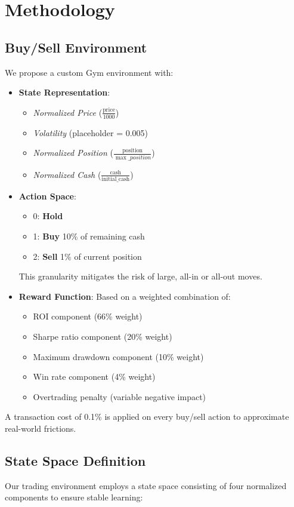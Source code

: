 \documentclass[11pt]{article}
\begin{document}
\section{Methodology}
\subsection{Buy/Sell Environment}
We propose a custom Gym environment with:
\begin{itemize}
  \item \textbf{State Representation}: 
  \begin{itemize}
    \item \textit{Normalized Price} (\(\frac{\text{price}}{1000}\))
    \item \textit{Volatility} (placeholder = 0.005)
    \item \textit{Normalized Position} (\(\frac{\text{position}}{\max\_position}\))
    \item \textit{Normalized Cash} (\(\frac{\text{cash}}{\text{initial\_cash}}\))
  \end{itemize}
  \item \textbf{Action Space}: 
  \begin{itemize}
    \item 0: \textbf{Hold}
    \item 1: \textbf{Buy} 10\% of remaining cash
    \item 2: \textbf{Sell} 1\% of current position
  \end{itemize}
  This granularity mitigates the risk of large, all-in or all-out moves.
  \item \textbf{Reward Function}: Based on a weighted combination of:
  \begin{itemize}
    \item ROI component (66\% weight)
    \item Sharpe ratio component (20\% weight)
    \item Maximum drawdown component (10\% weight)
    \item Win rate component (4\% weight)
    \item Overtrading penalty (variable negative impact)
  \end{itemize}
\end{itemize}
A transaction cost of 0.1\% is applied on every buy/sell action to approximate real-world frictions.

\subsection{State Space Definition}
Our trading environment employs a state space consisting of four normalized components to ensure stable learning:
\end{document}
